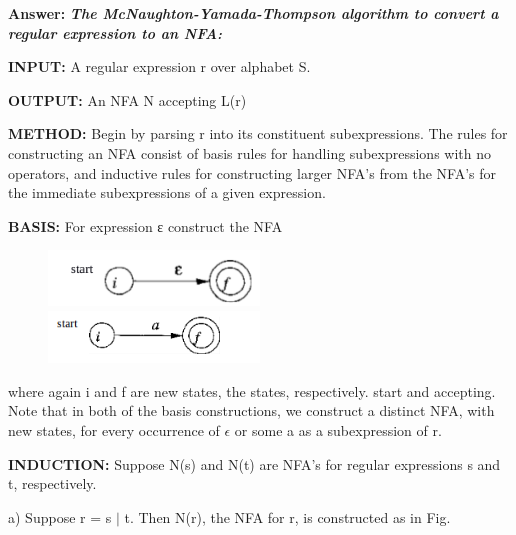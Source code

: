 \documentclass{article}
\begin{document}
\renewcommand{\labelitemi}{\textcolor{main}{\small $\blacktriangleright$}}
\renewcommand{\labelitemii}{\textcolor{second}{\scriptsize \textbullet}}


\begin{enbref}
\begin{answer}
\item \textbf{Answer: }
\textit{ \textbf{The McNaughton-Yamada-Thompson algorithm to convert a regular expression to an NFA:}}
\item \textbf{INPUT: }A regular expression r over alphabet S.
\item \textbf{OUTPUT: }An NFA N accepting L(r)
\item \textbf{METHOD: }Begin by parsing r into its constituent subexpressions. The rules for constructing
an NFA consist of basis rules for handling subexpressions with no operators, and inductive
rules for constructing larger NFA's from the NFA's for the immediate subexpressions of a
given expression.
\item \textbf{BASIS: }For expression ε construct the NFA\\
\begin{figure}
    \centering
    \includegraphics[width=0.5\textwidth]{4.png}
    \includegraphics[width=0.5\textwidth]{5.png}
\end{figure}
\item where again i and f are new states, the
states, respectively. start and accepting.\\
Note that in both of the basis constructions, we construct a distinct NFA, with new states, for
every occurrence of $\epsilon$ or some a as a subexpression of r.
\item \textbf{INDUCTION: }Suppose N(s) and N(t) are NFA's for regular expressions s and t, respectively.
\item a) Suppose r = s $|$ t. Then N(r), the NFA for r, is constructed as in Fig.

\end{answer}
\end{enbref}
\end{document}

